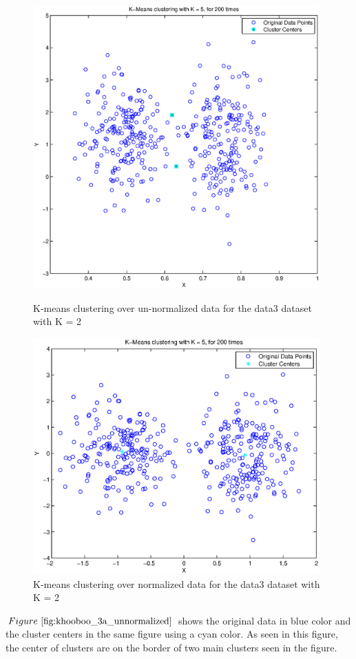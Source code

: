\documentclass{article} %
\begin{document}
\begin{figure}[h]
\begin{center}
\includegraphics[width=11cm]{Fig/fig_khooboo_3a.eps}
 \end{center}
\caption{\small{K-means clustering over un-normalized data for the data3 dataset with K = 2}}
\label{fig:khooboo_3a_unnormalized}
\begin{center}
\includegraphics[width=11cm]{Fig/fig_khooboo_3b.eps}
\end{center}
\caption{\small{K-means clustering over normalized data for the data3 dataset with K = 2}} 
\label{fig:khooboo_3b_normalized}
\end{figure}

$Figure~\ref{fig:khooboo_3a_unnormalized}$ shows  the original data in blue color and the cluster centers in the same figure using a cyan color. As seen in this figure, the center of clusters are on the border of two main clusters seen in the figure. 
\end{document}
